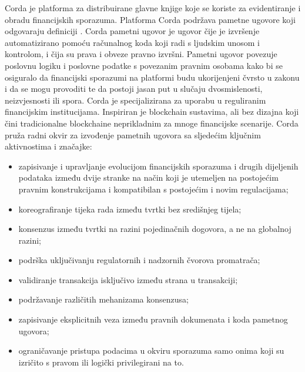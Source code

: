 \documentclass[times, utf8, diplomski]{fer}
\begin{document}
Corda je platforma za distribuirane glavne knjige koje se koriste za evidentiranje i obradu financijskih sporazuma. Platforma Corda podržava pametne ugovore koji odgovaraju definiciji \cite{Corda}. Corda pametni ugovor je ugovor čije je izvršenje automatizirano pomoću računalnog koda koji radi s ljudskim unosom i kontrolom, i čija su prava i obveze pravno izvršni. Pametni ugovor povezuje poslovnu logiku i poslovne podatke s povezanim pravnim osobama kako bi se osiguralo da financijski sporazumi na platformi budu ukorijenjeni čvrsto u zakonu i da se mogu provoditi te da postoji jasan put u slučaju dvosmislenosti, neizvjesnosti ili spora.
Corda je specijalizirana za uporabu u reguliranim financijskim institucijama. Inspiriran je blockchain sustavima, ali bez dizajna koji čini tradicionalne blockchaine neprikladnim za mnoge financijske scenarije. Corda pruža radni okvir za izvođenje pametnih ugovora sa sljedećim ključnim aktivnostima i značajke:

\begin{itemize}

\item zapisivanje i upravljanje evolucijom financijskih sporazuma i drugih dijeljenih podataka između dvije stranke na način koji je utemeljen na postojećim pravnim konstrukcijama i kompatibilan s postojećim i novim regulacijama;

\item koreografiranje tijeka rada između tvrtki bez središnjeg tijela;

\item konsenzus između tvrtki na razini pojedinačnih dogovora, a ne na globalnoj razini;

\item podrška uključivanju regulatornih i nadzornih čvorova promatrača;

\item validiranje transakcija isključivo između strana u transakciji;

\item podržavanje različitih mehanizama konsenzusa;

\item zapisivanje eksplicitnih veza između pravnih dokumenata i koda pametnog ugovora;

\item ograničavanje pristupa podacima u okviru sporazuma samo onima koji su izričito s pravom ili logički privilegirani na to.

\end{itemize}
\end{document}
